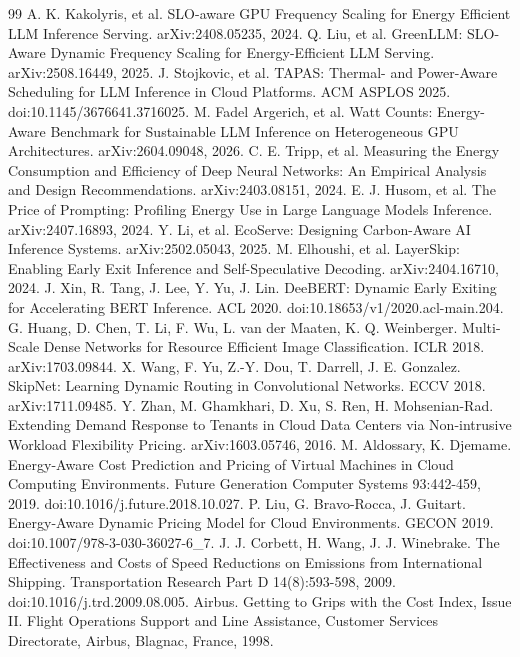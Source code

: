 \begin{thebibliography}{99}
\label{r45} A. K. Kakolyris, et al. SLO-aware GPU Frequency Scaling for Energy Efficient LLM Inference Serving.
arXiv:2408.05235, 2024.
\label{r46} Q. Liu, et al. GreenLLM: SLO-Aware Dynamic Frequency Scaling for Energy-Efficient LLM Serving.
arXiv:2508.16449, 2025.
\label{r47} J. Stojkovic, et al. TAPAS: Thermal- and Power-Aware Scheduling for LLM Inference in Cloud Platforms. ACM
ASPLOS 2025. doi:10.1145/3676641.3716025.
\label{r48} M. Fadel Argerich, et al. Watt Counts: Energy-Aware Benchmark for Sustainable LLM Inference on Heterogeneous
GPU Architectures. arXiv:2604.09048, 2026.
\label{r49} C. E. Tripp, et al. Measuring the Energy Consumption and Efficiency of Deep Neural Networks: An Empirical
Analysis and Design Recommendations. arXiv:2403.08151, 2024.
\label{r50} E. J. Husom, et al. The Price of Prompting: Profiling Energy Use in Large Language Models Inference.
arXiv:2407.16893, 2024.
\label{r51} Y. Li, et al. EcoServe: Designing Carbon-Aware AI Inference Systems. arXiv:2502.05043, 2025.
\label{r52} M. Elhoushi, et al. LayerSkip: Enabling Early Exit Inference and Self-Speculative Decoding. arXiv:2404.16710,
2024.
\label{r53} J. Xin, R. Tang, J. Lee, Y. Yu, J. Lin. DeeBERT: Dynamic Early Exiting for Accelerating BERT Inference. ACL
2020. doi:10.18653/v1/2020.acl-main.204.
\label{r54} G. Huang, D. Chen, T. Li, F. Wu, L. van der Maaten, K. Q. Weinberger. Multi-Scale Dense Networks for
Resource Efficient Image Classification. ICLR 2018. arXiv:1703.09844.
\label{r55} X. Wang, F. Yu, Z.-Y. Dou, T. Darrell, J. E. Gonzalez. SkipNet: Learning Dynamic Routing in Convolutional
Networks. ECCV 2018. arXiv:1711.09485.
\label{r56} Y. Zhan, M. Ghamkhari, D. Xu, S. Ren, H. Mohsenian-Rad. Extending Demand Response to Tenants in Cloud Data
Centers via Non-intrusive Workload Flexibility Pricing. arXiv:1603.05746, 2016.
\label{r57} M. Aldossary, K. Djemame. Energy-Aware Cost Prediction and Pricing of Virtual Machines in Cloud Computing
Environments. Future Generation Computer Systems 93:442-459, 2019. doi:10.1016/j.future.2018.10.027.
\label{r58} P. Liu, G. Bravo-Rocca, J. Guitart. Energy-Aware Dynamic Pricing Model for Cloud Environments. GECON 2019.
doi:10.1007/978-3-030-36027-6\_7.
\label{r59} J. J. Corbett, H. Wang, J. J. Winebrake. The Effectiveness and Costs of Speed Reductions on Emissions from
International Shipping. Transportation Research Part D 14(8):593-598, 2009. doi:10.1016/j.trd.2009.08.005.
\label{r60} Airbus. Getting to Grips with the Cost Index, Issue II. Flight Operations Support and Line Assistance,
Customer Services Directorate, Airbus, Blagnac, France, 1998.
\end{thebibliography}